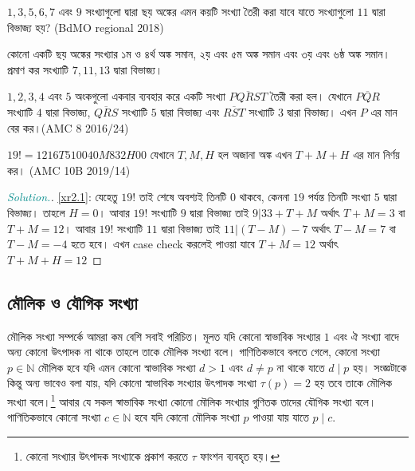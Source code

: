 \documentclass[a4paper,11pt]{article}
\newenvironment{sltn}{\begin{proof}[\emph{\textcolor{darkcyan}{Solution.}}]} {\end{proof}}
\begin{document}
\begin{Exercise}
	\label{xr-2}
	\begin{prob}
		$1,3,5,6,7$ এবং $9$ সংখ্যাগুলো দ্বারা ছয় অঙ্কের এমন কয়টি সংখ্যা তৈরী করা যাবে যাতে সংখ্যাগুলো $11$ দ্বারা বিভাজ্য হয়? (BdMO regional 2018)
	\end{prob}
	\begin{prob}
		কোনো একটি ছয় অঙ্কের সংখ্যার ১ম ও ৪র্থ অঙ্ক সমান, ২য় এবং ৫ম অঙ্ক সমান এবং ৩য় এবং ৬ষ্ঠ অঙ্ক সমান। প্রমাণ কর সংখ্যাটি $7,11,13$ দ্বারা বিভাজ্য। 
	\end{prob}
	\begin{prob}
		$1,2,3,4$ এবং $5$ অংকগুলো একবার ব্যবহার করে একটি সংখ্যা $\overline{PQRST}$ তৈরী করা হল। যেখানে $\overline{PQR}$ সংখ্যাটি $4$ দ্বারা বিভাজ্য, $\overline{QRS}$ সংখ্যাটি $5$ দ্বারা বিভাজ্য এবং $\overline{RST}$ সংখ্যাটি $3$ দ্বারা বিভাজ্য। এখন $P$ এর মান বের কর।(AMC 8 2016/24)
	\end{prob}
	\begin{prob}
		\label{xr2.1}
		$19!=1216T510040M832H00$ যেখানে $T,M,H$ হল অজানা অঙ্ক এখন $T+M+H$ এর মান নির্ণয় কর। (AMC 10B 2019/14)
	\end{prob}
\end{Exercise}
\begin{Answer}[ref={xr-2}]
	\begin{sltn} \ref{xr2.1}:
		যেহেতু $19!$ তাই শেষে অবশ্যই তিনটি $0$ থাকবে, কেননা $19$ পর্যন্ত তিনটি সংখ্যা $5$ দ্বারা বিভাজ্য। তাহলে $H=0$। আবার $19!$ সংখ্যাটি $9$ দ্বারা বিভাজ্য তাই $9|33+T+M$ অর্থাৎ $T+M=3$ বা $T+M=12$। আবার $19!$ সংখ্যাটি $11$ দ্বারা বিভাজ্য তাই $11|(T-M)-7$ অর্থাৎ $T-M=7$ বা $T-M=-4$ হতে হবে। এখন case check করলেই পাওয়া যাবে $T+M=12$ অর্থাৎ $T+M+H=12$
	\end{sltn}
\end{Answer}
\newpage
\subsection{মৌলিক ও যৌগিক সংখ্যা}
মৌলিক সংখ্যা সম্পর্কে আমরা কম বেশি সবাই পরিচিত। মূলত যদি কোনো স্বাভাবিক সংখ্যার $1$ এবং ঐ সংখ্যা বাদে অন্য কোনো উৎপাদক না থাকে তাহলে তাকে মৌলিক সংখ্যা বলে। গাণিতিকভাবে বলতে গেলে, কোনো সংখ্যা $p \in \mathbb{N}$ মৌলিক হবে যদি এমন কোনো স্বাভাবিক সংখ্যা $d>1$ এবং $d \neq p$ না থাকে যাতে $d \mid p$ হয়। সংজ্ঞটাকে কিন্তু অন্য ভাবেও বলা যায়, যদি কোনো স্বাভাবিক সংখ্যার উৎপাদক সংখ্যা $\tau(p)= 2$ হয় তবে তাকে মৌলিক সংখ্যা বলে।\footnote{কোনো সংখ্যার উৎপাদক সংখ্যাকে প্রকাশ করতে $\tau$ ফাংশন ব্যবহৃত হয়।} আবার যে সকল স্বাভাবিক সংখ্যা কোনো মৌলিক সংখ্যার গুণিতক তাদের যৌগিক সংখ্যা বলে। গাণিতিকভাবে কোনো সংখ্যা $c \in \mathbb{N}$ হবে যদি কোনো মৌলিক সংখ্যা $p$ পাওয়া যায় যাতে $p \mid c$.
\end{document}
